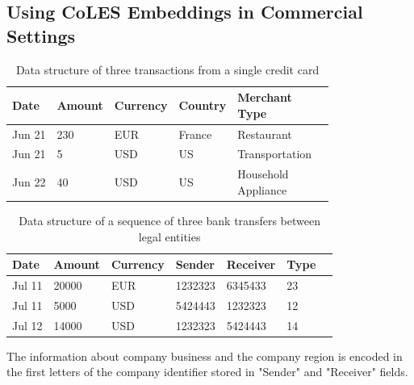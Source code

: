 \documentclass[sigconf]{acmart}
\begin{document}
\subsection{Using CoLES Embeddings in Commercial Settings}

\begin{table}
\centering
\caption{Data structure of three transactions from a single credit card}
\begin{tabular}{llllll}
\toprule
\textbf{Date} & \textbf{Amount} & \textbf{Currency} & \textbf{Country} & \makecell{\textbf{Merchant} \\ \textbf{Type}} \\
\midrule
Jun 21 & 230 & EUR & France & Restaurant \\
Jun 21 & 5 & USD & US & Transportation \\
Jun 22 & 40 & USD & US & \makecell[l]{Household \\ Appliance} \\
\bottomrule
\end{tabular}
\label{tab-tr-data}
\end{table}


\begin{table}
\centering
\caption{Data structure of a sequence of three bank transfers between legal entities}
\begin{tabular}{lllllll}
\toprule
\textbf{Date} & \textbf{Amount} & \textbf{Currency} & \textbf{Sender} & \textbf{Receiver} & \textbf{Type} \\
\midrule
Jul 11 & 20000 & EUR & 1232323 & 6345433 & 23 \\
Jul 11 & 5000 & USD & 5424443 & 1232323 & 12 \\
Jul 12 & 14000 & USD & 1232323 & 5424443 & 14 \\
\bottomrule
\end{tabular}
\small{The information about company business and the company region is encoded in the first letters of the company identifier stored in "Sender" and "Receiver" fields.}
\label{tab-org-tr-data}
\end{table}
\end{document}
